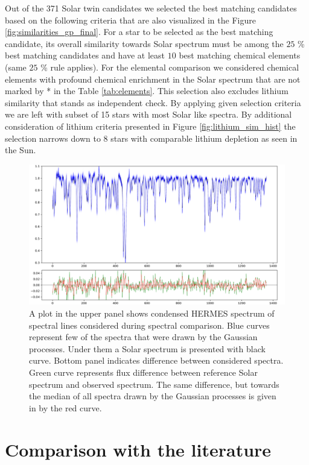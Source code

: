Out of the 371 Solar twin candidates we selected the best matching candidates based on the following criteria that are also visualized in the Figure \ref{fig:similarities_gp_final}. For a star to be selected as the best matching candidate, its overall similarity towards Solar spectrum must be among the $25$ \% best matching candidates and have at least $10$ best matching chemical elements (same $25$ \% rule applies). For the elemental comparison we considered chemical elements with profound chemical enrichment in the Solar spectrum that are not marked by * in the Table \ref{tab:elements}. This selection also excludes lithium similarity that stands as independent check. By applying given selection criteria we are left with subset of 15 stars with most Solar like spectra. By additional consideration of lithium criteria presented in Figure \ref{fig:lithium_sim_hist} the selection narrows down to 8 stars with comparable lithium depletion as seen in the Sun.

\begin{figure}
	\centering
	\includegraphics[width=\textwidth]{spectrum_comp.png}
	\caption{A plot in the upper panel shows condensed HERMES spectrum of spectral lines considered during spectral comparison. Blue curves represent few of the spectra that were drawn by the Gaussian processes. Under them a Solar spectrum is presented with black curve. Bottom panel indicates difference between considered spectra. Green curve represents flux difference between reference Solar spectrum and observed spectrum. The same difference, but towards the median of all spectra drawn by the Gaussian processes is given in by the red curve.}
	\label{fig:gp_compare_plot}
\end{figure}

\section{Comparison with the literature}
\label{sec:compare}

